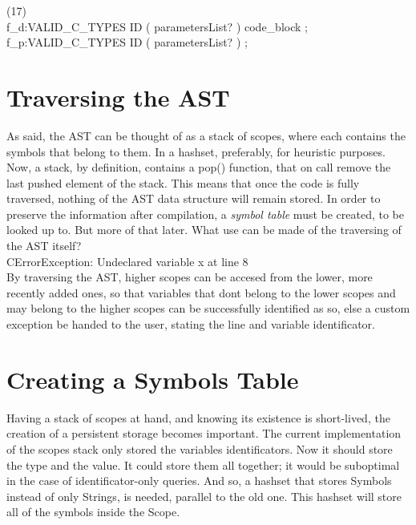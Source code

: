 \documentclass[twocolumn,10ptr]{article}
\begin{document}
	(17)\\
	
	f\_d:VALID\_C\_TYPES ID \textsc{}(\textsc{} parametersList? \textsc{})\textsc{} code\_block ;\\
	
	f\_p:VALID\_C\_TYPES ID \textsc{}(\textsc{} parametersList? \textsc{})\textsc{}  ;\\
	
	
	\section{ Traversing the AST}
	As said, the AST can be thought of as a stack of scopes, where each contains the symbols that belong to them. In a hashset, preferably, for heuristic purposes. Now, a stack, by definition, contains a pop() function, that on call remove the last pushed element of the stack. This means that once the code is fully traversed, nothing of the AST data structure will remain stored. In order to preserve the information after compilation, a \textit{symbol table} must be created, to be looked up to. But more of that later. What use can be made of the traversing of the AST itself?\\
	
	CErrorException: Undeclared variable x at line 8\\
	
	By traversing the AST, higher scopes can be accesed from the lower, more recently added ones, so that variables that dont belong to the lower scopes and may belong to the higher scopes can be successfully identified as so, else a custom exception be handed to the user, stating the line and variable identificator.
	
	
	\section{ Creating a Symbols Table}
	Having a stack of scopes at hand, and knowing its existence is short-lived, the creation of a persistent storage becomes important. The current implementation of the scopes stack only stored the variables identificators. Now it should store the type and the value. It could store them all together; it would be suboptimal in the case of identificator-only queries. And so, a hashset that stores Symbols instead of only Strings, is needed, parallel to the old one. This hashset will store all of the symbols inside the Scope.\\
	
\end{document}
